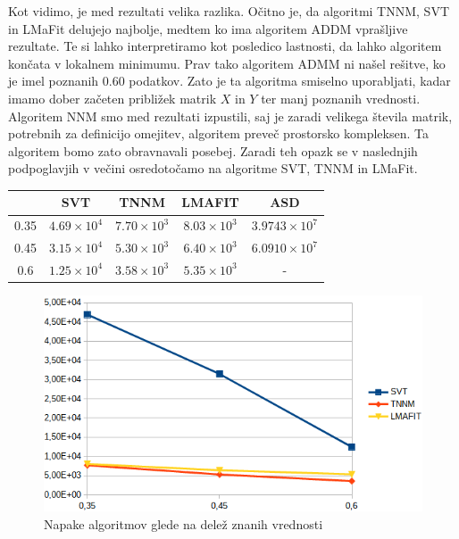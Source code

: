 Kot vidimo, je med rezultati velika razlika. Očitno je, da algoritmi TNNM, SVT in LMaFit delujejo najbolje, medtem ko ima algoritem ADDM vprašljive rezultate. Te si lahko interpretiramo kot posledico lastnosti, da lahko algoritem končata v lokalnem minimumu. Prav tako algoritem ADMM ni našel rešitve, ko je imel poznanih $0.60$ podatkov. Zato je ta algoritma smiselno uporabljati, kadar imamo dober začeten približek matrik $X$ in $Y$ ter manj poznanih vrednosti. Algoritem NNM smo med rezultati izpustili, saj je zaradi velikega števila matrik, potrebnih za definicijo omejitev, algoritem preveč prostorsko kompleksen. Ta algoritem bomo zato obravnavali posebej. Zaradi teh opazk se v naslednjih podpoglavjih v večini osredotočamo na algoritme SVT, TNNM in LMaFit.
\begin{table}[h]
    \centering
    \begin{tabular}{|c|c|c|c|c|}
    \hline
    & SVT & TNNM & LMAFIT & ASD \\ \hline
    0.35 & $4.69 \times 10^4$ & $7.70 \times 10^3$ & $8.03 \times 10^3$ & $3.9743 \times 10^7$ \\ \hline
    0.45 & $3.15 \times 10^4$ & $5.30 \times 10^3$ & $6.40 \times 10^3$ & $6.0910 \times 10^7$ \\ \hline
    0.6 & $1.25 \times 10^4$ & $3.58 \times 10^3$ & $5.35 \times 10^3$ & - \\ \hline
    \end{tabular}
\end{table}
\begin{figure}[!ht]
    \centering
    \includegraphics[width=\linewidth]{Poglavja/Slike/grayscale1000/grafNapake.png}
    \caption{Napake algoritmov glede na delež znanih vrednosti}
\end{figure}

